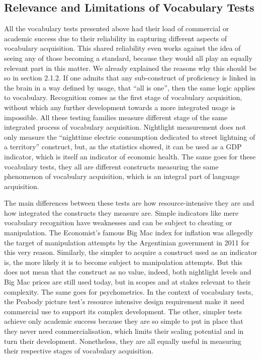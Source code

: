     \subsection{Relevance and Limitations of Vocabulary Tests}
All the vocabulary tests presented above had their load of commercial or academic success due to their reliability in capturing different aspects of vocabulary acquisition. This shared reliability even works against the idea of seeing any of those becoming a standard, because they would all play an equally relevant part in this matter. We already explained the reasons why this should be so in section 2.1.2. If one admits that any sub-construct of proficiency is linked in the brain in a way defined by usage, that ``all is one'', then the same logic applies to vocabulary. Recognition comes as the first stage of vocabulary acquisition, without which any further development towards a more integrated usage is impossible. All these testing families measure different stage of the same integrated process of vocabulary acquisition. Nightlight measurement does not only measure the ``nighttime electric consumption dedicated to street lightning of a territory'' construct, but, as the statistics showed, it can be used as a GDP indicator, which is itself an indicator of economic health. The same goes for these vocabulary tests, they all are different constructs measuring the same phenomenon of vocabulary acquisition, which is an integral part of language acquisition.

The main differences between these tests are how resource-intensive they are and how integrated the constructs they measure are. Simple indicators like mere vocabulary recognition have weaknesses and can be subject to cheating or manipulation. The Economist's famous Big Mac index for inflation was allegedly the target of manipulation attempts by the Argentinian government in 2011 \parencite{politi_argentinas_2011} for this very reason. Similarly, the simpler to acquire a construct used as an indicator is, the more likely it is to become subject to manipulation attempts. But this does not mean that the construct as no value, indeed, both nightlight levels and Big Mac prices are still used today, but in scopes and at stakes relevant to their complexity. The same goes for psychometrics. In the context of vocabulary tests, the Peabody picture test's resource intensive design requirement make it need commercial use to support its complex development. The other, simpler tests achieve only academic success because they are so simple to put in place that they never need commercialisation, which limits their scaling potential and in turn their development. Nonetheless, they are all equally useful in measuring their respective stages of vocabulary acquisition.

